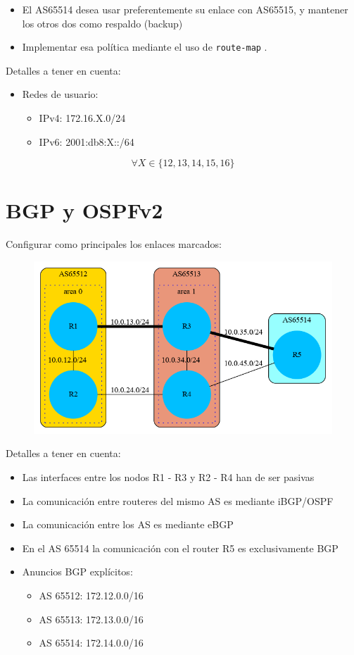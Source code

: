 \documentclass{article}
\begin{document}
  \begin{itemize}
    \item El AS65514 desea usar preferentemente su enlace con AS65515,
    y mantener los otros dos como respaldo (backup)
    \item Implementar esa política mediante el uso de \texttt{route-map} .
  \end{itemize}

  Detalles a tener en cuenta:

  \begin{itemize}
    \item Redes de usuario:
    \begin{itemize}
      \item IPv4: 172.16.X.0/24
      \item IPv6: 2001:db8:X::/64
    \end{itemize}
  \end{itemize}

  \[ \forall X \in \{12,13,14,15,16\} \]

\section{BGP y OSPFv2}
  Configurar como principales los enlaces marcados:
  \begin{figure}[h]
    \includegraphics[width=12cm]{bgp_next_hop.png}
  \end{figure}

  Detalles a tener en cuenta:

  \begin{itemize}
    \item Las interfaces entre los nodos R1 - R3 y R2 - R4 han de ser pasivas
    \item La comunicación entre routeres del mismo AS es mediante iBGP/OSPF
    \item La comunicación entre los AS es mediante eBGP
    \item En el AS 65514 la comunicación con el router R5 es exclusivamente BGP
    \item Anuncios BGP explícitos:
    \begin{itemize}
      \item AS 65512: 172.12.0.0/16
      \item AS 65513: 172.13.0.0/16
      \item AS 65514: 172.14.0.0/16
    \end{itemize}
  \end{itemize}
\end{document}
